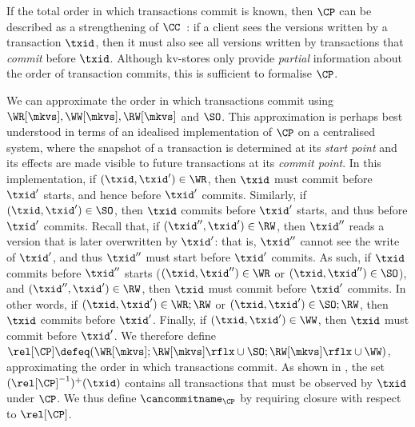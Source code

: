 


\label{para:cp}
If the total order in which transactions commit is known, then \(\CP\)
can be described as a strengthening of \(\CC\)~\cite{laws}: 
if a client sees the versions written by a transaction \(\txid\),
then it must also see all versions written by transactions that \emph{commit} before \(\txid\). 
Although kv-stores only provide \emph{partial} information about the
order of  transaction commits, 
this is sufficient to formalise $\CP$.

We can approximate the order in which transactions 
commit using \(\WR[\mkvs], \allowbreak \WW[\mkvs], \allowbreak \RW[\mkvs]\) and \(\SO\). 
This approximation is perhaps best understood in terms of an idealised implementation of \(\CP\) on a centralised system,
where the snapshot of a transaction is determined at its \emph{start point} and its effects are made visible to future transactions at its \emph{commit point}.
In this implementation, if \((\txid,\txid') \in \WR\), then 
\(\txid\) must commit before \(\txid'\) starts, and hence before \(\txid'\) commits.
Similarly, if \((\txid,\txid') \in \SO\), then \(\txid\) commits before \(\txid'\) starts, 
and thus before \(\txid'\) commits.
Recall that, if \((\txid'', \txid') \in \RW\),
then \(\txid''\) reads a version that is later overwritten by
\(\txid'\):
that is, \(\txid''\) cannot see the write of \(\txid'\), and thus \(\txid''\) must start before 
\(\txid'\) commits. 
As such, if \(\txid\) commits before \(\txid''\) starts 
(\((\txid, \txid'') \in \WR\) or \((\txid,\txid'') \in \SO\)), 
and \((\txid'', \txid') \in \RW\), then \(\txid\) must commit before 
\(\txid'\) commits. 
In other words, if \((\txid,\txid') \in \WR;\RW\) or \((\txid,\txid') \in \SO;\RW\), then \(\txid\) commits before \(\txid'\).
Finally, if \((\txid,\txid') \in\WW\), then \(\txid\) must commit before \(\txid'\). 
We therefore define \(\rel[\CP] \defeq (\WR[\mkvs]; \RW[\mkvs]\rflx \cup \SO;  \RW[\mkvs]\rflx \cup \WW)\), approximating the order in which transactions commit. 
%
As shown in \citet{laws}, the set \((\rel[\CP]^{-1})^{+}(\txid)\) contains all transactions that must be observed by \(\txid\) under \(\CP\). 
We thus define \(\cancommitname_{\CP}\) by requiring closure with
respect to \(\rel[\CP]\).


